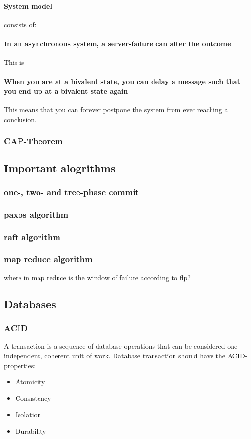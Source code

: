 \paragraph{System model} consists of:
\paragraph{In an asynchronous system, a server-failure can alter the outcome} This is
\paragraph{When you are at a bivalent state, you can delay a message such that you end up at a bivalent state again} This means that you can forever postpone the system from ever reaching a conclusion. 

\subsubsection{CAP-Theorem}


\subsection{Important alogrithms}

\subsubsection{one-, two- and tree-phase commit}

\subsubsection{paxos algorithm}

\subsubsection{raft algorithm}

\subsubsection{map reduce algorithm}
where in map reduce is the window of failure according to flp?


\subsection{Databases}

\subsubsection{ACID}
A transaction is a sequence of database operations that can be considered one independent, coherent unit of work. Database transaction should have the ACID-properties:
\begin{itemize}
    \item Atomicity
    \item Consistency
    \item Isolation
    \item Durability
\end{itemize}


